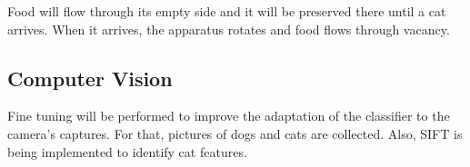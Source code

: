 Food will flow through its empty side and it will be preserved there until a cat arrives. When it arrives, the apparatus rotates and food flows through vacancy.

\subsection{Computer Vision}

Fine tuning will be performed to improve the adaptation of the classifier to the camera's captures. For that, pictures of dogs and cats are collected. Also, SIFT is being implemented to identify cat features.